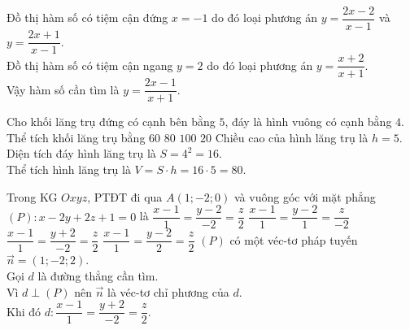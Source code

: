 \begin{ex}%
\loigiai
{
Đồ thị hàm số có tiệm cận đứng $x=-1$ do đó loại phương án $y=\dfrac{2x-2}{x-1}$ và $y=\dfrac{2x+1}{x-1}$.\\
Đồ thị hàm số có tiệm cận ngang $y=2$ do đó loại phương án $y=\dfrac{x+2}{x+1}$.\\
Vậy hàm số cần tìm là $y=\dfrac{2x-1}{x+1}$.
}
\end{ex}

\begin{ex}%
Cho khối lăng trụ đứng có cạnh bên bằng $5$, đáy là hình vuông có cạnh bằng $4$. Thể tích khối lăng trụ bằng
\choice 
{$60$} 
{\True $80$}
{$100$} 
{$20$}
\loigiai
{
Chiều cao của hình lăng trụ là $h=5$.\\
Diện tích đáy hình lăng trụ là $S=4^2=16$.\\
Thể tích hình lăng trụ là $V=S\cdot h=16\cdot 5=80 $.
}
\end{ex}

\begin{ex}%
Trong KG $Oxyz$, PTĐT đi qua $A(1;-2;0)$ và vuông góc với mặt phẳng $(P)\colon x-2y+2z+1=0$ là
\choice 
{$\dfrac{x-1}{1}=\dfrac{y-2}{-2}=\dfrac{z}{2}$} 
{$\dfrac{x-1}{1}=\dfrac{y-2}{1}=\dfrac{z}{-2}$}
{\True $\dfrac{x-1}{1}=\dfrac{y+2}{-2}=\dfrac{z}{2}$} 
{$\dfrac{x-1}{1}=\dfrac{y-2}{2}=\dfrac{z}{2}$}
\loigiai
{
$(P)$ có một véc-tơ pháp tuyến $\overrightarrow{n}=(1;-2;2)$.\\
Gọi $d$ là đường thẳng cần tìm.\\
Vì $d\perp (P)$ nên $\overrightarrow{n}$ là véc-tơ chỉ phương của $d$.\\
Khi đó $d\colon\dfrac{x-1}{1}=\dfrac{y+2}{-2}=\dfrac{z}{2}$.
}
\end{ex}

